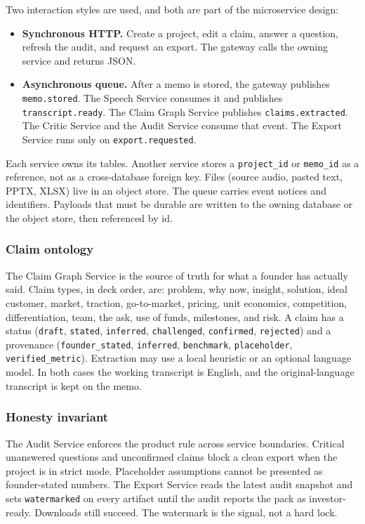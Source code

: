 \documentclass[11pt,a4paper]{article}
\begin{document}
Two interaction styles are used, and both are part of the microservice design:

\begin{itemize}
  \item \textbf{Synchronous HTTP.} Create a project, edit a claim, answer a question, refresh the audit, and request an export. The gateway calls the owning service and returns JSON.
  \item \textbf{Asynchronous queue.} After a memo is stored, the gateway publishes \texttt{memo.stored}. The Speech Service consumes it and publishes \texttt{transcript.ready}. The Claim Graph Service publishes \texttt{claims.extracted}. The Critic Service and the Audit Service consume that event. The Export Service runs only on \texttt{export.requested}.
\end{itemize}

Each service owns its tables. Another service stores a \texttt{project\_id} or \texttt{memo\_id} as a reference, not as a cross-database foreign key. Files (source audio, pasted text, PPTX, XLSX) live in an object store. The queue carries event notices and identifiers. Payloads that must be durable are written to the owning database or the object store, then referenced by id.

\subsubsection{Claim ontology}

The Claim Graph Service is the source of truth for what a founder has actually said. Claim types, in deck order, are: problem, why now, insight, solution, ideal customer, market, traction, go-to-market, pricing, unit economics, competition, differentiation, team, the ask, use of funds, milestones, and risk. A claim has a status (\texttt{draft}, \texttt{stated}, \texttt{inferred}, \texttt{challenged}, \texttt{confirmed}, \texttt{rejected}) and a provenance (\texttt{founder\_stated}, \texttt{inferred}, \texttt{benchmark}, \texttt{placeholder}, \texttt{verified\_metric}). Extraction may use a local heuristic or an optional language model. In both cases the working transcript is English, and the original-language transcript is kept on the memo.

\subsubsection{Honesty invariant}

The Audit Service enforces the product rule across service boundaries. Critical unanswered questions and unconfirmed claims block a clean export when the project is in strict mode. Placeholder assumptions cannot be presented as founder-stated numbers. The Export Service reads the latest audit snapshot and sets \texttt{watermarked} on every artifact until the audit reports the pack as investor-ready. Downloads still succeed. The watermark is the signal, not a hard lock.
\end{document}
